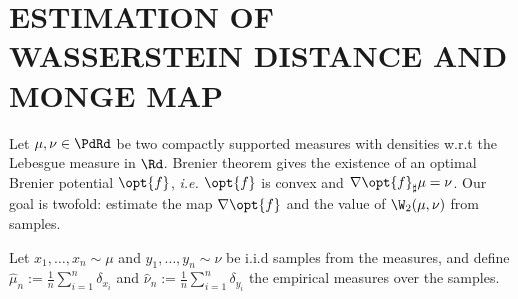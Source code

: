 \section{ESTIMATION OF WASSERSTEIN DISTANCE AND MONGE MAP}


Let $\mu, \nu \in \PdRd$ be two compactly supported measures with densities w.r.t the Lebesgue measure in $\Rd$. Brenier theorem gives the existence of an optimal Brenier potential $\opt{f}$, \textit{i.e.} $\opt{f}$ is convex and $\nabla \opt{f}_\sharp\mu = \nu$. Our goal is twofold: estimate the map $\nabla \opt{f}$ and the value of $\W_2(\mu, \nu)$ from samples.

Let $x_1, \ldots, x_n \sim \mu$ and $y_1, \ldots, y_n \sim \nu$ be i.i.d samples from the measures, and define $\hat\mu_n := \frac{1}{n}\sum_{i=1}^n \delta_{x_i}$ and $\hat\nu_n := \frac{1}{n}\sum_{i=1}^n \delta_{y_i}$ the empirical measures over the samples.

